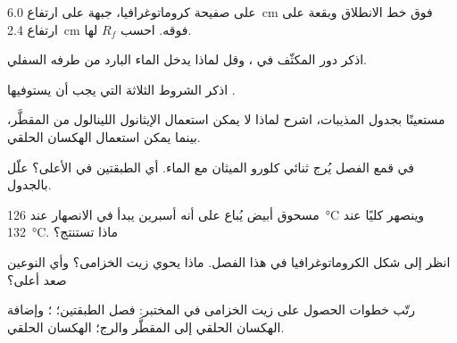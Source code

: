 \begin{exercise}[$\star$]\label{exo:g10:chemical-species:3}
على صفيحة كروماتوغرافيا، جبهة  على ارتفاع \qty{6.0}{cm} فوق خط الانطلاق
وبقعة على ارتفاع \qty{2.4}{cm} فوقه. احسب $R_f$ لها.
\end{exercise}

\begin{exercise}[$\star$]\label{exo:g10:chemical-species:4}
اذكر دور المكثّف في ، وقل لماذا يدخل الماء البارد من طرفه
السفلي.
\end{exercise}

\begin{exercise}[$\star$]\label{exo:g10:chemical-species:5}
اذكر الشروط الثلاثة التي يجب أن يستوفيها  .
\end{exercise}

\begin{exercise}[$\star\star$]\label{exo:g10:chemical-species:6}
مستعينًا بجدول المذيبات، اشرح لماذا لا يمكن استعمال الإيثانول 
اللينالول من المقطَّر، بينما يمكن استعمال الهكسان الحلقي.
\end{exercise}

\begin{exercise}[$\star\star$]\label{exo:g10:chemical-species:7}
في قمع الفصل يُرج ثنائي كلورو الميثان مع الماء. أي الطبقتين في الأعلى؟ علّل
بالجدول.
\end{exercise}

\begin{exercise}[$\star\star$]\label{exo:g10:chemical-species:8}
مسحوق أبيض يُباع على أنه أسبرين يبدأ في الانصهار عند \qty{126}{\celsius}
وينصهر كليًا عند \qty{132}{\celsius}. ماذا تستنتج؟
\end{exercise}

\begin{exercise}[$\star\star$]\label{exo:g10:chemical-species:9}
انظر إلى شكل الكروماتوغرافيا في هذا الفصل. ماذا يحوي زيت الخزامى؟ وأي
النوعين صعد أعلى؟
\end{exercise}

\begin{exercise}[$\star\star$]\label{exo:g10:chemical-species:10}
رتّب خطوات الحصول على زيت الخزامى في المختبر: فصل الطبقتين؛ ؛ وإضافة الهكسان الحلقي إلى المقطَّر والرج؛  الهكسان
الحلقي.
\end{exercise}

